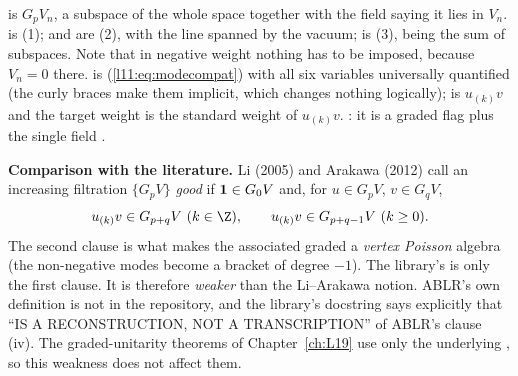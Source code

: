 \begin{dictionary}
 is $G_pV_n$, a subspace of the whole space  together with the field
 saying it lies in $V_n$.  is (1);  and  are
(2), with  the line spanned by the vacuum;  is (3),  being
the sum of subspaces. Note that in negative weight nothing has to be imposed, because $V_n = 0$ there.
 is (\ref{l11:eq:modecompat}) with all six variables universally quantified
(the curly braces make them implicit, which changes nothing logically);  is
$u_{(k)}v$ and the target weight  is the standard weight of $u_{(k)}v$.
  : it is a graded flag plus the single field
.

\textbf{Comparison with the literature.} Li (2005) and Arakawa (2012) call an increasing filtration
$\{G_pV\}$ \emph{good} if $\mathbf{1}\in G_0V$ and, for $u\in G_pV$, $v\in G_qV$,
\begin{equation*}
u_{(k)}v\in G_{p+q}V\ (k\in\Z),\qquad u_{(k)}v\in G_{p+q-1}V\ (k\ge0).
\end{equation*}
The second clause is what makes the associated graded a \emph{vertex Poisson} algebra (the non-negative
modes become a bracket of degree $-1$). The library's  is only the first clause.
It is therefore \emph{weaker} than the Li--Arakawa notion. ABLR's own definition is not in the
repository, and the library's docstring says explicitly that  ``IS A
RECONSTRUCTION, NOT A TRANSCRIPTION'' of ABLR's clause (iv). The graded-unitarity theorems of
Chapter~\ref{ch:L19} use only the underlying , so this weakness does not affect them.
\end{dictionary}

